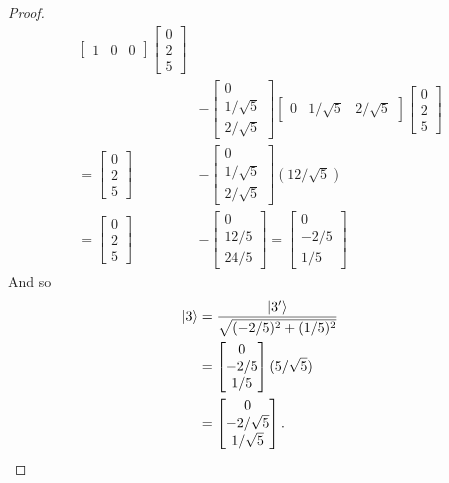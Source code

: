 \begin{proof}
\begin{align*}
\begin{bmatrix}
    1 & 0 & 0
    \end{bmatrix}
    \begin{bmatrix}
    0 \\
    2 \\
    5
    \end{bmatrix} \\
    &-
    \begin{bmatrix}
    0 \\
    1/\sqrt{5} \\
    2/\sqrt{5}
    \end{bmatrix}
    \begin{bmatrix}
    0 & 1/\sqrt{5} & 2/\sqrt{5}
    \end{bmatrix}
    \begin{bmatrix}
    0 \\
    2 \\
    5
    \end{bmatrix} \\
    =
    \begin{bmatrix}
    0 \\
    2 \\
    5
    \end{bmatrix}
    &-
    \begin{bmatrix}
    0 \\
    1/\sqrt{5} \\
    2/\sqrt{5}
    \end{bmatrix}
    (12/\sqrt{5}) \\
    = 
    \begin{bmatrix}
    0 \\
    2 \\
    5
    \end{bmatrix}
    &- 
    \begin{bmatrix}
    0 \\
    12/5 \\
    24/5
    \end{bmatrix} 
    =
    \begin{bmatrix}
    0 \\
    -2/5 \\
    1/5
    \end{bmatrix}
\end{align*}
And so
\begin{align*}
    \ket{3} &= \frac{\ket{3'}}{\sqrt{(-2/5)^2 + (1/5)^2}} \\
    &= 
    \begin{bmatrix}
    0 \\
    -2/5 \\
    1/5
    \end{bmatrix}
    (5/\sqrt{5}) \\
    &= 
    \begin{bmatrix}
    0 \\
    -2/\sqrt{5} \\
    1/\sqrt{5}
    \end{bmatrix}.
\end{align*}
\end{proof}

